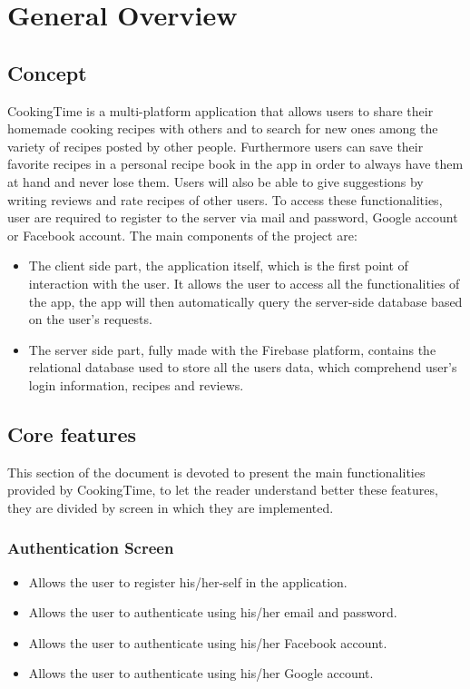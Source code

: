 \chapter{General Overview}

\section{Concept}
	CookingTime is a multi-platform application that allows users to share their homemade cooking recipes with others and to search for new ones among the variety of recipes posted by other people.
	Furthermore users can save their favorite recipes in a personal recipe book in the app in order to always have them at hand and never lose them.
	Users will also be able to give suggestions by writing reviews and rate recipes of other users.
	To access these functionalities, user are required to register to the server via mail and password, Google account or Facebook account.
	The main components of the project are:
	\begin{itemize}
		\item The client side part, the application itself, which is the first point of interaction with the user.
		It allows the user to access all the functionalities of the app, the app will then automatically query the server-side database based on the user's requests.
		
		\item The server side part, fully made with the Firebase platform, contains the relational database used to store all the users data, which comprehend user's login information, recipes and reviews.
	\end{itemize}


\section{Core features}
	This section of the document is devoted to present the main functionalities provided by CookingTime, to let the reader understand better these features, 
	they are divided by screen in which they are implemented.
	
	\subsection{Authentication Screen}
		\begin{itemize}
			\item Allows the user to register his/her-self in the application.
		
			\item Allows the user to authenticate using his/her email and password.
			
			\item Allows the user to authenticate using his/her Facebook account.
			
			\item Allows the user to authenticate using his/her Google account.
		\end{itemize}


